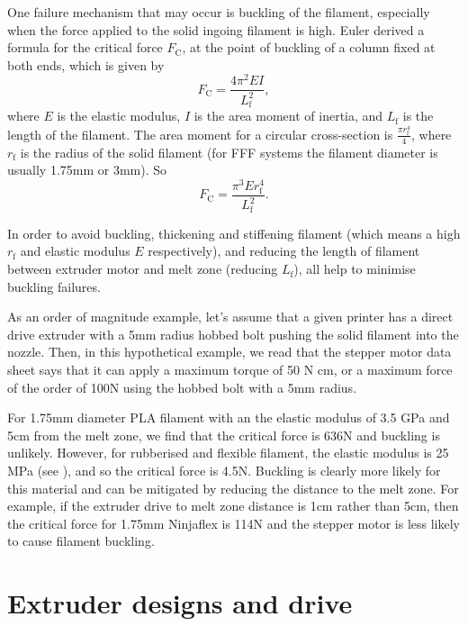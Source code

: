 One failure mechanism that may occur is buckling of the filament, especially when the force applied to the solid ingoing filament is high. Euler derived a formula for the critical force $F_{\textrm{C}}$, at the point of buckling of a column fixed at both ends, which is given by 
\begin{equation}
F_{\textrm{C}} = \frac{4 \pi^{2} E I}{L_{\textrm{f}}^{2}}, 
\end{equation}
where $E$ is the elastic modulus, $I$ is the area moment of inertia, and $L_{\textrm{f}}$ is the length of the filament. The area moment for a circular cross-section is $\tfrac{\pi r_{\textrm{f}}^{4}}{4}$, where $r_{\textrm{f}}$ is the radius of the solid filament (for FFF systems the filament diameter is usually 1.75mm or 3mm). So 
\begin{equation}
F_{\textrm{C}} = \frac{\pi^{3} E r_{\textrm{f}}^{4} }{L_{\textrm{f}}^{2}}. 
\end{equation}

In order to avoid buckling, thickening and stiffening filament (which means a high $r_{\textrm{f}}$ and elastic modulus $E$ respectively), and reducing the length of filament between extruder motor and melt zone (reducing $L_{\textrm{f}}$), all help to minimise buckling failures. 

As an order of magnitude example, let's assume that a given printer has a direct drive extruder with a 5mm radius hobbed bolt pushing the solid filament into the nozzle. Then, in this hypothetical example, we read that the stepper motor data sheet says that it can apply a maximum torque of 50 N cm, or a maximum force of the order of 100N using the hobbed bolt with a 5mm radius.  

For 1.75mm diameter PLA filament with an the elastic modulus of 3.5 GPa and 5cm from the melt zone, we find that the critical force is 636N and buckling is unlikely. However, for rubberised and flexible filament, the elastic modulus is 25 MPa (see \cite{filament_discussion}), and so the critical force is 4.5N. Buckling is clearly more likely for this material and can be mitigated by reducing the distance to the melt zone. For example, if the extruder drive to melt zone distance is 1cm rather than 5cm, then the critical force for 1.75mm Ninjaflex is 114N and the stepper motor is less likely to cause filament buckling. 


\section{Extruder designs and drive}

